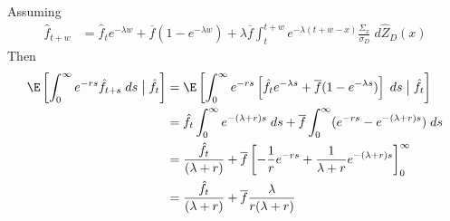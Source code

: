 \documentclass[12pt]{article}
\theoremstyle{plain}
\theoremstyle{definition}
\theoremstyle{remark}
\begin{document}
Assuming
\begin{align*}
  \hat{f}_{t+w}
  &=
  \hat{f}_{t}
  e^{-\lambda w}
  +
  \overline{f}
  (1-e^{-\lambda w})
  +
  \lambda \overline{f}
  \int_t^{t+w}
  e^{-\lambda (t+w-x)}
  \frac{\Sigma_x}{\sigma_D}
  \;d\hat{Z}_D(x)
\end{align*}
Then
\begin{align*}
  \E\left[ \int_0^\infty e^{-rs}
  \hat{f}_{t+s}\;ds\;\big|\;\hat{f}_t\right]
  &=
  \E\left[ \int_0^\infty
  e^{-rs}
  \left[
  \hat{f}_{t}
  e^{-\lambda s}
  +
  \overline{f}
  (1-e^{-\lambda s})
  \right]
  \;ds
  \;\big|\;\hat{f}_t\right]
  \\
  &=
  \hat{f}_{t}
  \int_0^\infty
  e^{-(\lambda+r) s}
  \;ds
  +
  \overline{f}
  \int_0^\infty
  (
  e^{-rs}
  -e^{-(\lambda+r) s}
  )
  \;ds
  \\
  &=
  \frac{\hat{f}_{t}}{(\lambda+r)}
  +
  \overline{f}
  \left[
  -\frac{1}{r}
  e^{-rs}
  +\frac{1}{\lambda+r}
  e^{-(\lambda+r) s}
  \right]_0^\infty
  \\
  &=
  \frac{\hat{f}_{t}}{(\lambda+r)}
  +
  \overline{f}
  \frac{\lambda}{r(\lambda+r)}
\end{align*}
\end{document}
